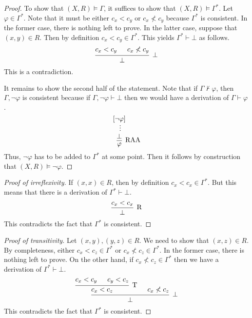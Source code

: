 \documentclass[a4paper]{article}
\begin{document}
\begin{enumerate}
\begin{proof}
    To show that $(X,R) \vDash \Gamma$, it suffices to show that $(X,R) \vDash \Gamma^*$.
    Let $\varphi \in \Gamma^*$.
    Note that it must be either $c_x < c_y$ or $c_x \nless c_y$ because $\Gamma^*$ is consistent.
    In the former case, there is nothing left to prove.
    In the latter case, suppose that $(x,y) \in R$.
    Then by definition $c_x < c_y \in \Gamma^*$.
    This yields $\Gamma^* \vdash \bot$ as follows.
    \[
      \begin{prooftree}
        \hypo{c_x < c_y}
        \hypo{c_x \nless c_y}
        \infer2[$\bot$]{\bot}
      \end{prooftree}
    \]
    This is a contradiction.

    It remains to show the second half of the statement.
    Note that if $\Gamma \nvdash \varphi$, then $\Gamma,\lnot\varphi$ is consistent because if $\Gamma,\lnot\varphi \vdash \bot$ then we would have a derivation of $\Gamma \vdash \varphi$.
    \[
      \begin{prooftree}
        \hypo{[\lnot\varphi]}
        \ellipsis{}{\bot}
        \infer1[RAA]{\varphi}
      \end{prooftree}
    \]
    Thus, $\lnot\varphi$ has to be added to $\Gamma^*$ at some point.
    Then it follows by construction that $(X,R) \vDash \lnot\varphi$.
  \end{proof}
  \begin{proof}[Proof of irreflexivity]
    If $(x,x) \in R$, then by definition $c_{x} < c_{x} \in \Gamma^{*}$.
    But this means that there is a derivation of $\Gamma^* \vdash \bot$.
    \[
      \begin{prooftree}
        \hypo{c_{x} < c_{x}}
        \infer1[R]{\bot}
      \end{prooftree}
    \]
    This contradicts the fact that $\Gamma^*$ is consistent.
  \end{proof}
  \begin{proof}[Proof of transitivity]
    Let $(x,y),(y,z) \in R$.
    We need to show that $(x,z) \in R$.
    By completeness, either $c_{x} < c_{z} \in \Gamma^*$ or $c_{x} \nless c_{z} \in \Gamma^*$.
    In the former case, there is nothing left to prove.
    On the other hand, if $c_{x} \nless c_{z} \in \Gamma^*$ then we have a derivation of $\Gamma^* \vdash \bot$.
    \[\begin{prooftree}
        \hypo{c_{x} < c_{y}}
        \hypo{c_{y} < c_{z}}
        \infer2[T]{c_{x} < c_{z}}
        \hypo{c_{x} \nless c_{z}}
        \infer2[$\bot$]{\bot}
      \end{prooftree}\]
    This contradicts the fact that $\Gamma^*$ is consistent.
  \end{proof}
  

\end{enumerate}
\end{document}
